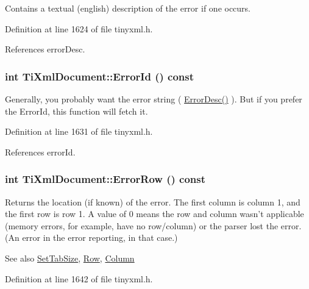 Contains a textual (english) description of the error if one occurs. 

Definition at line 1624 of file tinyxml.h.

References errorDesc.\hypertarget{class_ti_xml_document_af96fc2f3f9ec6422782bfe916c9e778f}{
\subsubsection[{ErrorId}]{\setlength{\rightskip}{0pt plus 5cm}int TiXmlDocument::ErrorId () const}}
\label{class_ti_xml_document_af96fc2f3f9ec6422782bfe916c9e778f}
Generally, you probably want the error string ( \hyperlink{class_ti_xml_document_a9d0f689f6e09ea494ea547be8d79c25e}{ErrorDesc()} ). But if you prefer the ErrorId, this function will fetch it. 

Definition at line 1631 of file tinyxml.h.

References errorId.\hypertarget{class_ti_xml_document_af30efc75e804aa2e92fb8be3a8cb676e}{
\subsubsection[{ErrorRow}]{\setlength{\rightskip}{0pt plus 5cm}int TiXmlDocument::ErrorRow () const}}
\label{class_ti_xml_document_af30efc75e804aa2e92fb8be3a8cb676e}
Returns the location (if known) of the error. The first column is column 1, and the first row is row 1. A value of 0 means the row and column wasn't applicable (memory errors, for example, have no row/column) or the parser lost the error. (An error in the error reporting, in that case.)

\begin{DoxySeeAlso}{See also}
\hyperlink{class_ti_xml_document_a51dac56316f89b35bdb7d0d433ba988e}{SetTabSize}, \hyperlink{class_ti_xml_base_a024bceb070188df92c2a8d8852dd0853}{Row}, \hyperlink{class_ti_xml_base_ab54bfb9b70fe6dd276e7b279cab7f003}{Column} 
\end{DoxySeeAlso}


Definition at line 1642 of file tinyxml.h.

